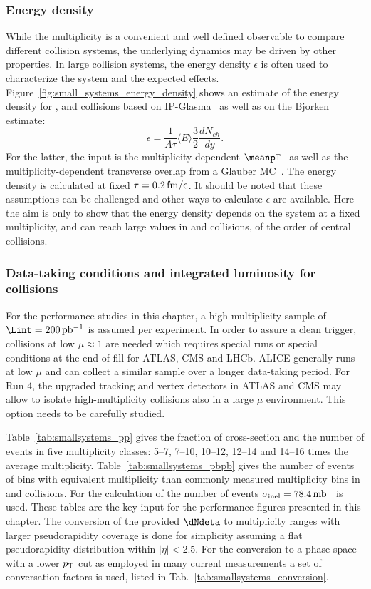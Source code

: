 \documentclass[../report.tex]{subfiles}
\begin{document}
\subsubsection{Energy density}
While the multiplicity is a convenient and well defined observable to compare different collision systems, the underlying dynamics may be driven by other properties. In large collision systems, the energy density $\epsilon$ is often used to characterize the system and the expected effects. Figure~\ref{fig:small_systems_energy_density} shows an estimate of the energy density for \pp, \pPb and \PbPb collisions based on IP-Glasma~\cite{Bzdak:2013zma} as well as on the Bjorken estimate:
\begin{equation}
  \epsilon = \frac{1}{A \tau} \langle E \rangle \frac{3}{2} \frac{dN_{ch}}{dy}.
\end{equation}
For the latter, the input is the multiplicity-dependent $\meanpT$~\cite{Abelev:2013bla,Acharya:2018njl} as well as the multiplicity-dependent transverse overlap from a Glauber MC~\cite{Loizides:2017ack}. The energy density is calculated at fixed $\tau = \unit[0.2]{fm/c}$. It should be noted that these assumptions can be challenged and other ways to calculate $\epsilon$ are available. Here the aim is only to show that the energy density depends on the system at a fixed multiplicity, and can reach large values in \pp and \pPb collisions, of the order of central \PbPb collisions.

\subsubsection{Data-taking conditions and integrated luminosity for \pp collisions}
For the performance studies in this chapter, a high-multiplicity sample of $\Lint = \unit[200]{pb^{-1}}$ is assumed per experiment. In order to assure a clean trigger, collisions at low $\mu \approx 1$ are needed which requires special runs or special conditions at the end of fill for ATLAS, CMS and LHCb. ALICE generally runs at low $\mu$ and can collect a similar sample over a longer data-taking period. For Run 4, the upgraded tracking and vertex detectors in ATLAS and CMS may allow to isolate high-multiplicity collisions also in a large $\mu$ environment. This option needs to be carefully studied.

Table~\ref{tab:smallsystems_pp} gives the fraction of cross-section and the number of events in five multiplicity classes:  5--7, 7--10, 10--12, 12--14 and 14--16 times the average multiplicity. Table~\ref{tab:smallsystems_pbpb} gives the number of events of bins with equivalent multiplicity than commonly measured multiplicity bins in \pPb and \PbPb collisions. For the calculation of the number of events $\sigma_{\rm inel} = \unit[78.4]{mb}$~\cite{Loizides:2017ack} is used. These tables are the key input for the performance figures presented in this chapter. 
The conversion of the provided $\dNdeta$ to multiplicity ranges with larger pseudorapidity coverage is done for simplicity assuming a flat pseudorapidity distribution within $|\eta| < 2.5$. For the conversion to a phase space with a lower $p\sb{\scriptstyle\mathrm{T}}$ cut as employed in many current measurements a set of conversation factors is used, listed in Tab.~\ref{tab:smallsystems_conversion}.
\end{document}
